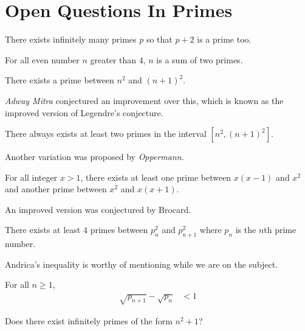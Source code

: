 \documentclass{subfiles}
\begin{document}
\section{Open Questions In Primes}
	\begin{conjecture}
		There exists infinitely many primes $p$ so that $p+2$ is a prime too.
	\end{conjecture}

	\begin{conjecture}
		For all even number $n$ greater than $4$, $n$ is a sum of two primes.
	\end{conjecture}

	\begin{conjecture}\label{open:legendre}
		There exists a prime between $n^2$ and $(n+1)^2$.
	\end{conjecture}

	\textit{Adway Mitra} conjectured an improvement over this, which is known as the improved version of Legendre's conjecture.
	\begin{conjecture}
		There always exists at least two primes in the interval $[n^2,(n+1)^2]$.
	\end{conjecture}

	Another variation was proposed by \textit{Oppermann}.
	\begin{conjecture}
		For all integer $x>1$, there exists at least one prime between $x(x-1)$ and $x^2$ and another prime between $x^2$ and $x(x+1)$.
	\end{conjecture}
	An improved version was conjectured by Brocard.
	\begin{conjecture}\label{open:brocard}
		There exists at least $4$ primes between $p_n^2$ and $p_{n+1}^2$ where $p_n$ is the $n$th prime number.
	\end{conjecture}
	Andrica's inequality is worthy of mentioning while we are on the subject.
	\begin{conjecture}
		For all $n\geq1$,
		\begin{align*}
		\sqrt{p_{n+1}}-\sqrt{p_n} & < 1
		\end{align*}
	\end{conjecture}

	\begin{conjecture}[$n^2+1$ Problem]
		Does there exist infinitely primes of the form $n^2+1$?
	\end{conjecture}
\end{document}
